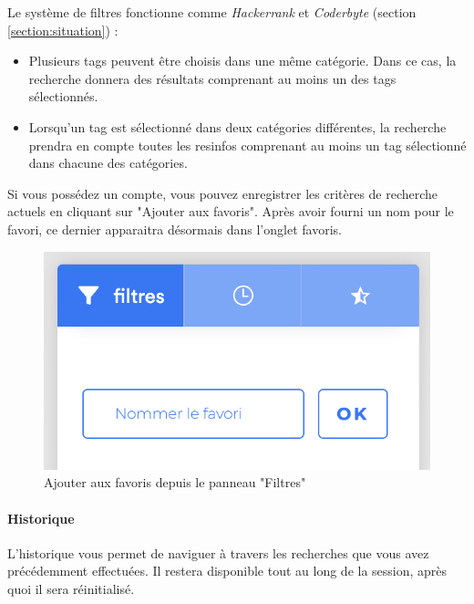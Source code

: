 Le système de filtres fonctionne comme \textit{Hackerrank} et \textit{Coderbyte} (section \ref{section:situation}) :

\begin{itemize}
    \item Plusieurs \glspl{tag} peuvent être choisis dans une même catégorie. Dans ce cas, la recherche donnera des résultats comprenant au moins un des \glspl{tag} sélectionnés.
    \item Lorsqu'un \gls{tag} est sélectionné dans deux catégories différentes, la recherche prendra en compte toutes les \glspl{resinfo} comprenant au moins un \gls{tag} sélectionné dans chacune des catégories.
\end{itemize}

Si vous possédez un compte, vous pouvez enregistrer les critères de recherche actuels en cliquant sur "Ajouter aux favoris". Après avoir fourni un nom pour le favori, ce dernier apparaitra désormais dans l'onglet favoris.\\

\begin{figure}[H]
    \includegraphics[width=\textwidth,height=0.1\textheight,keepaspectratio]{images/client/add-favorite.png}
    \centering
    \caption[SourceCode : Ajouter aux favoris depuis le panneau "Filtres"]{Ajouter aux favoris depuis le panneau "Filtres"}
\end{figure}

\paragraph{Historique} L'historique vous permet de naviguer à travers les recherches que vous avez précédemment effectuées. Il restera disponible tout au long de la session, après quoi il sera réinitialisé.\\

